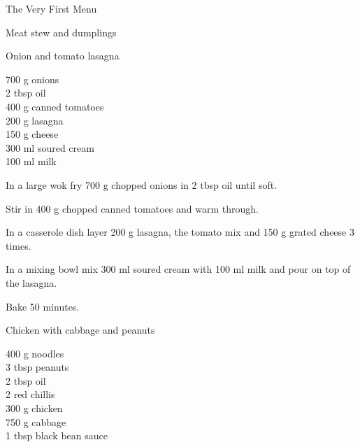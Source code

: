 \begin{menu}{The Very First Menu}
\begin{recipe}{2}{Meat stew and dumplings}
\begin{instructions}
    \end{instructions}
    \end{recipe}%
  
    \begin{recipe}{2}{Onion and tomato lasagna}%
    
	
		\begin{ingredients}
		700 g onions  \\
	2 tbsp oil  \\
	400 g canned tomatoes  \\
	200 g lasagna  \\
	150 g cheese  \\
	300 ml soured cream  \\
	100 ml milk  \\
	
		\end{ingredients}
	
    \begin{instructions}
    \item 
        In a large wok fry
        700 g chopped onions
        in
        2 tbsp  oil
        until soft.
      \item 
        Stir in 400 g chopped canned tomatoes
        and warm through.
      \item 
        In a casserole dish layer
        200 g  lasagna,
        the tomato mix and
        150 g grated cheese
        3 times.
      \item 
        In a mixing bowl mix
        300 ml  soured cream
        with
        100 ml  milk
        and pour on top of the lasagna.
      \item 
        Bake  50 minutes.
      
    \end{instructions}
    \end{recipe}%
  
    \begin{recipe}{2}{Chicken with cabbage and peanuts}%
    
		\begin{ingredients}
		400 g noodles  \\
	3 tbsp peanuts  \\
	2 tbsp oil  \\
	2  red chillis  \\
	300 g chicken  \\
	750 g cabbage  \\
	1 tbsp black bean sauce  \\
	

\end{ingredients}
\end{recipe}
\end{menu}
